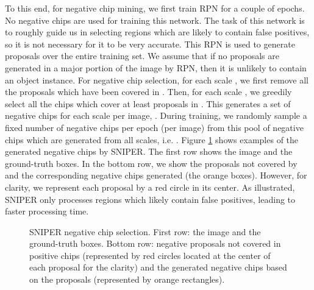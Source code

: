 \documentclass{article}
\begin{document}
To this end, for negative chip mining, we first train RPN for a couple of epochs. No negative chips are used for training this network. The task of this network is to roughly guide us in selecting regions which are likely to contain false positives, so it is not necessary for it to be very accurate. This RPN is used to generate proposals over the entire training set.  We assume that if no proposals are generated in a major portion of the image by RPN, then it is unlikely to contain an object instance. For negative chip selection, for each scale , we first remove all the proposals which have been covered in . Then, for each scale , we greedily select all the chips which cover at least  proposals in . This generates a set of negative chips for each scale per image, . During training, we randomly sample a fixed number of negative chips per epoch (per image) from this pool of negative chips which are generated from all scales, i.e. . Figure \ref{fig:neg_chips} shows examples of the generated negative chips by SNIPER. The first row shows the image and the ground-truth boxes. In the bottom row, we show the proposals not covered by  and the corresponding negative chips generated (the orange boxes). However, for clarity, we represent each proposal by a red circle in its center. As illustrated, SNIPER only processes regions which likely contain false positives, leading to faster processing time.

\begin{figure}
\caption{SNIPER negative chip selection. First row: the image and the ground-truth boxes. Bottom row: negative proposals not covered in positive chips (represented by red circles located at the center of each proposal for the clarity) and the generated negative chips based on the proposals (represented by orange rectangles).}
\label{fig:neg_chips}
\end{figure} 
\end{document}
